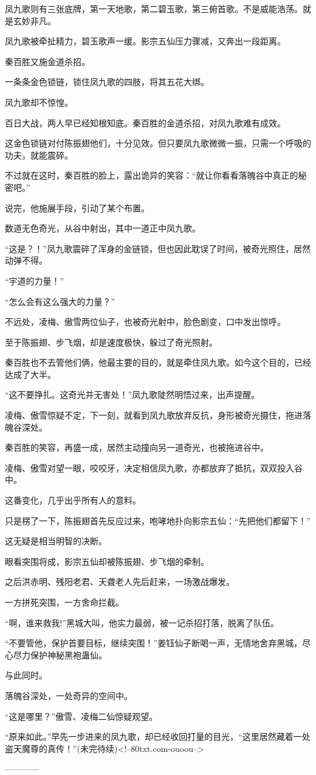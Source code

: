 \begin{this_body}
凤九歌则有三张底牌，第一天地歌，第二碧玉歌，第三俯首歌。不是威能浩荡。就是玄妙非凡。

凤九歌被牵扯精力，碧玉歌声一缓。影宗五仙压力骤减，又奔出一段距离。

秦百胜又施金道杀招。

一条条金色锁链，锁住凤九歌的四肢，将其五花大绑。

凤九歌却不惊惶。

百日大战，两人早已经知根知底。秦百胜的金道杀招，对凤九歌难有成效。

这金色锁链对付陈振翅他们，十分见效。但只要凤九歌微微一振，只需一个呼吸的功夫，就能震碎。

不过就在这时，秦百胜的脸上，露出诡异的笑容：“就让你看看落魄谷中真正的秘密吧。”

说完，他施展手段，引动了某个布置。

数道无色奇光，从谷中射出，其中一道正中凤九歌。

“这是？！”凤九歌震碎了浑身的金链锁，但也因此耽误了时间，被奇光照住，居然动弹不得。

“宇道的力量！”

“怎么会有这么强大的力量？”

不远处，凌梅、傲雪两位仙子，也被奇光射中，脸色剧变，口中发出惊呼。

至于陈振翅、步飞烟，却是速度极快，躲过了奇光照射。

秦百胜也不去管他们俩，他最主要的目的，就是牵住凤九歌。如今这个目的，已经达成了大半。

“这不要挣扎。这奇光并无害处！”凤九歌陡然明悟过来，出声提醒。

凌梅、傲雪惊疑不定，下一刻，就看到凤九歌放弃反抗，身形被奇光摄住，拖进落魄谷深处。

秦百胜的笑容，再盛一成，居然主动撞向另一道奇光，也被拖进谷中。

凌梅、傲雪对望一眼，咬咬牙，决定相信凤九歌，亦都放弃了抵抗，双双投入谷中。

这番变化，几乎出乎所有人的意料。

只是楞了一下，陈振翅首先反应过来，咆哮地扑向影宗五仙：“先把他们都留下！”

这无疑是相当明智的决断。

眼看突围将成，影宗五仙却被陈振翅、步飞烟的牵制。

之后洪赤明、残阳老君、天聋老人先后赶来，一场激战爆发。

一方拼死突围，一方舍命拦截。

“啊，谁来救我!”黑城大叫，他实力最弱，被一记杀招打落，脱离了队伍。

“不要管他，保护首要目标，继续突围！”姜钰仙子断喝一声，无情地舍弃黑城，尽心尽力保护神秘黑袍蛊仙。

与此同时。

落魄谷深处，一处奇异的空间中。

“这是哪里？”傲雪、凌梅二仙惊疑观望。

“原来如此。”早先一步进来的凤九歌，却已经收回打量的目光，“这里居然藏着一处盗天魔尊的真传！”(未完待续)<!--80txt.com-ouoou-->

------------

\end{this_body}

